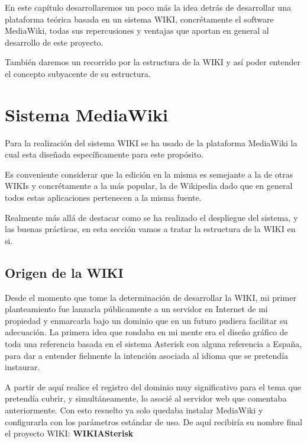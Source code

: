 
En este capítulo desarrollaremos un poco más la idea detrás de desarrollar una plataforma teórica basada en un sistema WIKI, concrétamente el software MediaWiki, todas sus repercusiones y ventajas que aportan en general al desarrollo de este proyecto.

También daremos un recorrido por la estructura de la WIKI y así poder entender el concepto subyacente de su estructura.

\section{Sistema MediaWiki}

Para la realización del sistema WIKI se ha usado de la plataforma MediaWiki \cite{website:mediawiki} la cual esta diseñada específicamente para este propósito.

Es conveniente considerar que la edición en la misma es semejante a la de otras WIKIs y concrétamente a la más popular, la de Wikipedia dado que en general todos estas aplicaciones pertenecen a la misma fuente.

Realmente más allá de destacar como se ha realizado el despliegue del sistema, y las buenas prácticas, en esta sección vamos a tratar la estructura de la WIKI en si.

\subsection{Origen de la WIKI}

Desde el momento que tome la determinación de desarrollar la WIKI, mi primer planteamiento fue lanzarla públicamente a un servidor en Internet de mi propiedad y enmarcarla bajo un dominio que en un futuro pudiera facilitar su adecuación. La primera idea que rondaba en mi mente era el diseño gráfico de toda una referencia basada en el sistema Asterisk con alguna referencia a España, para dar a entender fielmente la intención asociada al idioma que se pretendía instaurar.

A partir de aquí realice el registro del dominio \cite{website:wikiasterisk} muy significativo para el tema que pretendía cubrir, y simultáneamente, lo asocié al servidor web que comentaba anteriormente. Con esto resuelto ya solo quedaba instalar MediaWiki y configurarla con los parámetros estándar de uso. De aquí recibiría su nombre final el proyecto WIKI: \textbf{WIKIASterisk}

